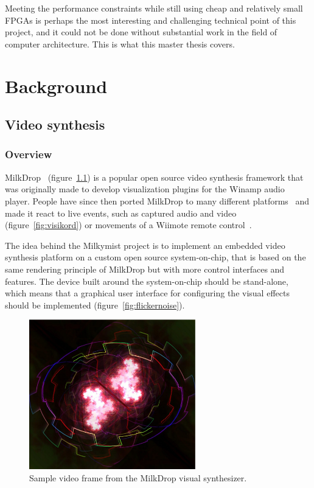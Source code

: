\documentclass[a4paper,11pt]{kthesis}
\begin{document}
Meeting the performance constraints while still using cheap and relatively small FPGAs is perhaps the most interesting and challenging technical point of this project, and it could not be done without substantial work in the field of computer architecture. This is what this master thesis covers.

\chapter{Background}
\section{Video synthesis}
\subsection{Overview}
MilkDrop~\cite{milkdrop} (figure~\ref{fig:milkdrop}) is a popular open source video synthesis framework that was originally made to develop visualization plugins for the Winamp audio player. People have since then ported MilkDrop to many different platforms~\cite{wpmilkdrop} and made it react to live events, such as captured audio and video~\cite{visikord} (figure~\ref{fig:visikord}) or movements of a Wiimote remote control~\cite{wiimodemd}.

The idea behind the Milkymist project is to implement an embedded video synthesis platform on a custom open source system-on-chip, that is based on the same rendering principle of MilkDrop but with more control interfaces and features. The device built around the system-on-chip should be stand-alone, which means that a graphical user interface for configuring the visual effects should be implemented (figure~\ref{fig:flickernoise}).

\begin{figure}[htp]
\centering
\includegraphics[height=65mm]{milkdrop2.eps}
\caption{Sample video frame from the MilkDrop visual synthesizer.}
\label{fig:milkdrop}
\end{figure}
\end{document}
